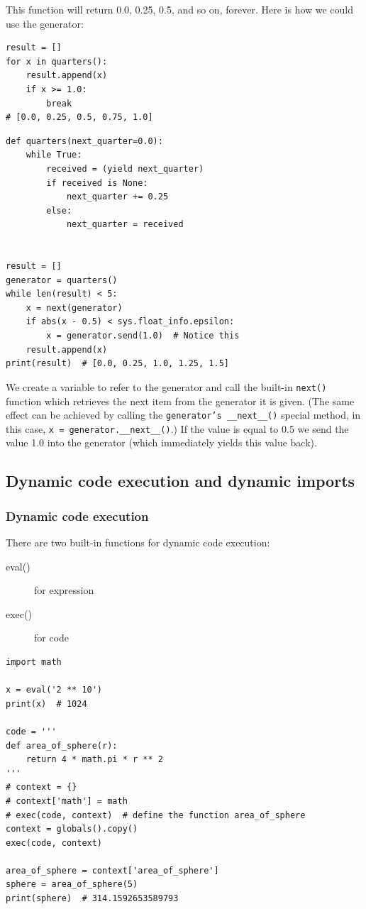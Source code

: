 This function will return 0.0, 0.25, 0.5, and so on, forever.
Here is how we could use the generator:
\begin{lstlisting}
result = []
for x in quarters():
    result.append(x)
    if x >= 1.0:
        break  
# [0.0, 0.25, 0.5, 0.75, 1.0]
\end{lstlisting}


\begin{lstlisting}
def quarters(next_quarter=0.0):
    while True:
        received = (yield next_quarter)
        if received is None:
            next_quarter += 0.25
        else:
            next_quarter = received


result = []
generator = quarters()
while len(result) < 5:
    x = next(generator)
    if abs(x - 0.5) < sys.float_info.epsilon:
        x = generator.send(1.0)  # Notice this
    result.append(x)
print(result)  # [0.0, 0.25, 1.0, 1.25, 1.5]  
\end{lstlisting}

We create a variable to refer to the generator and
call the built-in \verb|next()| function which retrieves the next item from the generator it is given.
(The same effect can be achieved by calling the \verb|generator’s __next__()| special method,
in this case, \verb|x = generator.__next__()|.)
If the value is equal to 0.5 we send the value 1.0 into the generator (which immediately yields this value back). 



\subsection{Dynamic code execution and dynamic imports}

\subsubsection{Dynamic code execution}

There are two built-in functions for dynamic code execution:
\begin{description}
\item[eval()] for expression
\item[exec()] for code
\end{description}


\begin{lstlisting}
import math

x = eval('2 ** 10')
print(x)  # 1024

code = '''
def area_of_sphere(r):
    return 4 * math.pi * r ** 2
'''
# context = {}
# context['math'] = math
# exec(code, context)  # define the function area_of_sphere
context = globals().copy()
exec(code, context)

area_of_sphere = context['area_of_sphere']
sphere = area_of_sphere(5)
print(sphere)  # 314.1592653589793  
\end{lstlisting}


